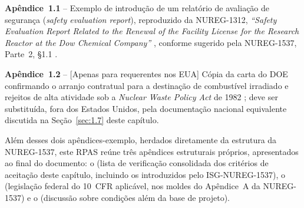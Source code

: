 \textbf{Ap\^endice~1.1} -- Exemplo de introdu\c{c}\~ao de um relat\'orio
de avalia\c{c}\~ao de seguran\c{c}a (\textit{safety evaluation report}),
reproduzido da NUREG-1312, \emph{``Safety Evaluation Report Related to
the Renewal of the Facility License for the Research Reactor at the Dow
Chemical Company''} \citep{nureg1312}, conforme sugerido pela NUREG-1537,
Parte~2, \S1.1 \citep{nureg1537p2}.

\textbf{Ap\^endice~1.2} -- [Apenas para requerentes nos EUA] C\'opia da
carta do DOE confirmando o arranjo contratual para a destina\c{c}\~ao de
combust\'ivel irradiado e rejeitos de alta atividade sob a \emph{Nuclear
Waste Policy Act} de 1982 \citep{nwpa1982}; deve ser substitu\'ida, fora
dos Estados Unidos, pela documenta\c{c}\~ao nacional equivalente discutida
na Se\c{c}\~ao~\ref{sec:1.7} deste cap\'itulo.

Al\'em desses dois ap\^endices-exemplo, herdados diretamente da estrutura
da NUREG-1537, este RPAS re\'une tr\^es ap\^endices estruturais pr\'oprios,
apresentados ao final do documento: o \textbf{}
(lista de verifica\c{c}\~ao consolidada dos crit\'erios de aceita\c{c}\~ao
deste cap\'itulo, incluindo os introduzidos pelo ISG-NUREG-1537), o
\textbf{} (legisla\c{c}\~ao federal do 10~CFR
aplic\'avel, nos moldes do Ap\^endice~A da NUREG-1537) e o
\textbf{} (discuss\~ao sobre condi\c{c}\~oes
al\'em da base de projeto).
